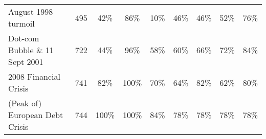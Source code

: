 \documentclass[12pt]{article}
\begin{document}
\begin{table}[H]
{\begin{tabular}{@{}lcccccccc@{}}
August 1998 turmoil            & 495                                                                         & 42\%                                                                                 & 86\%                                                                              & 10\%                                                                                 & 46\%                                                                            & 46\%                                                                                & 52\%                                                                                      & 76\%                                                                               \\
Dot-com Bubble \& 11 Sept 2001 & 722                                                                         & 44\%                                                                                 & 96\%                                                                              & 58\%                                                                                 & 60\%                                                                            & 66\%                                                                                & 72\%                                                                                      & 84\%                                                                               \\
2008 Financial Crisis          & 741                                                                         & 82\%                                                                                 & 100\%                                                                             & 70\%                                                                                 & 64\%                                                                            & 82\%                                                                                & 62\%                                                                                      & 80\%                                                                               \\
(Peak of) European Debt Crisis & 744                                                                         & 100\%                                                                                & 100\%                                                                             & 84\%                                                                                 & 78\%                                                                            & 78\%                                                                                & 78\%                                                                                      & 78\%                                                                               \\

\end{tabular}}
\end{table}
\end{document}
